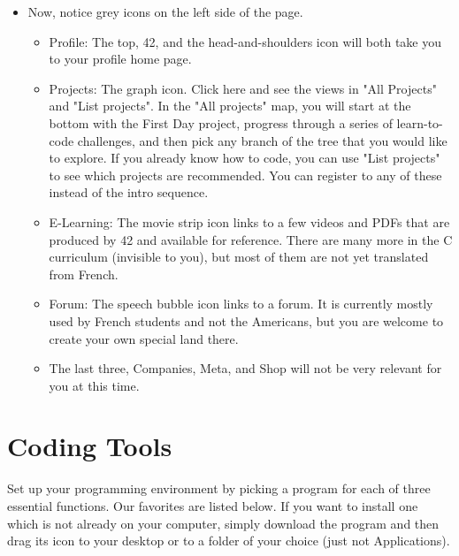 \documentclass{42-en}
\begin{document}
\begin{itemize}
	\item Now, notice grey icons on the left side of the page. 
	\begin{itemize}
		\item Profile: The top, 42, and the head-and-shoulders icon will both take you to your profile home page.
		\item Projects: The graph icon. Click here and see the views in "All Projects" and "List projects". In the "All projects" map, you will start at the bottom with the First Day project, progress through a series of learn-to-code challenges, and then pick any branch of the tree that you would like to explore. If you already know how to code, you can use "List projects" to see which projects are recommended. You can register to any of these instead of the intro sequence.
		\item E-Learning: The movie strip icon links to a few videos and PDFs that are produced by 42 and available for reference. There are many more in the C curriculum (invisible to you), but most of them are not yet translated from French.
		\item Forum: The speech bubble icon links to a forum. It is currently mostly used by French students and not the Americans, but you are welcome to create your own special land there.
		\item The last three, Companies, Meta, and Shop will not be very relevant for you at this time.
	\end{itemize}

\end{itemize}


\chapter{Coding Tools}

Set up your programming environment by picking a program for each of three essential functions. Our favorites are listed below. If you want to install one which is not already on your computer, simply download the program and then drag its icon to your desktop or to a folder of your choice (just not Applications). 
\end{document}
